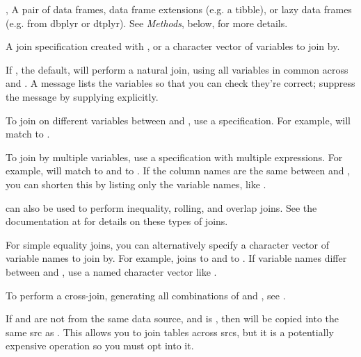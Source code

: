 \documentclass[a4paper]{book}
\begin{document}
%
\begin{Arguments}
\begin{ldescription}
\item[\code{x}, \code{y}] A pair of data frames, data frame extensions (e.g. a tibble), or
lazy data frames (e.g. from dbplyr or dtplyr). See \emph{Methods}, below, for
more details.

\item[\code{by}] A join specification created with , or a character
vector of variables to join by.

If , the default,  will perform a natural join, using all
variables in common across  and . A message lists the variables so
that you can check they're correct; suppress the message by supplying 
explicitly.

To join on different variables between  and , use a 
specification. For example,  will match  to .

To join by multiple variables, use a  specification with
multiple expressions. For example,  will match
 to  and  to . If the column names are the same between
 and , you can shorten this by listing only the variable names, like
.

 can also be used to perform inequality, rolling, and overlap
joins. See the documentation at  for details on
these types of joins.

For simple equality joins, you can alternatively specify a character vector
of variable names to join by. For example,  joins 
to  and  to . If variable names differ between  and ,
use a named character vector like .

To perform a cross-join, generating all combinations of  and , see
.

\item[\code{copy}] If  and  are not from the same data source,
and  is , then  will be copied into the
same src as .  This allows you to join tables across srcs, but
it is a potentially expensive operation so you must opt into it.


\end{ldescription}
\end{Arguments}
\end{document}
